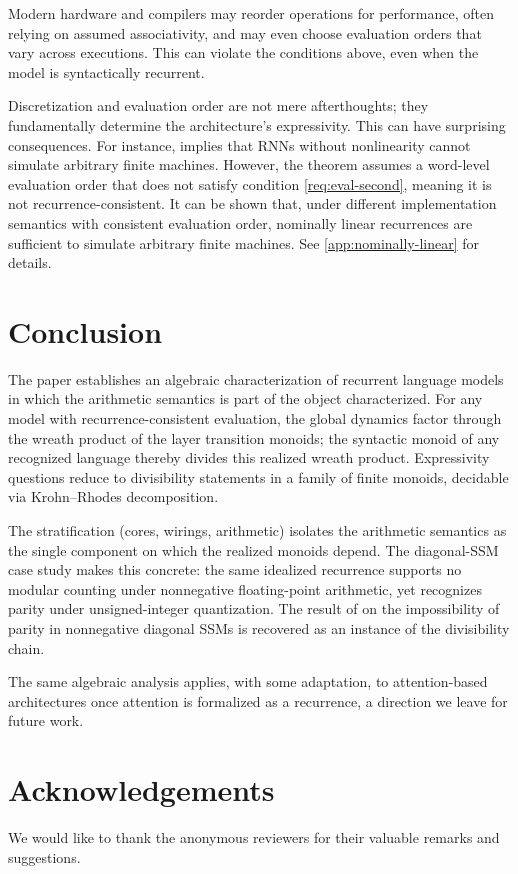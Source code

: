 \documentclass{article}
\begin{document}
Modern hardware and compilers may reorder operations for performance, often relying on assumed associativity, and may even choose evaluation orders that vary across executions. This can violate the conditions above, even when the model is syntactically recurrent.

Discretization and evaluation order are not mere afterthoughts; they fundamentally determine the architecture's expressivity. This can have surprising consequences. For instance, \citet[Theorem 4.2]{merrill2024illusion} implies that RNNs without nonlinearity cannot simulate arbitrary finite machines. However, the theorem assumes a word-level evaluation order that does not satisfy condition \ref{req:eval-second}, meaning it is not recurrence-consistent. It can be shown that, under different implementation semantics with consistent evaluation order, nominally linear recurrences are sufficient to simulate arbitrary finite machines. See \cref{app:nominally-linear} for details.

\section{Conclusion}
The paper establishes an algebraic characterization of recurrent language models in which the arithmetic semantics is part of the object characterized. 
For any model with recurrence-consistent evaluation, the global dynamics factor through the wreath product of the layer transition monoids; the syntactic monoid of any recognized language thereby divides this realized wreath product. 
Expressivity questions reduce to divisibility statements in a family of finite monoids, decidable via Krohn--Rhodes decomposition.

The stratification (cores, wirings, arithmetic) isolates the arithmetic semantics as the single component on which the realized monoids depend. 
The diagonal-SSM case study makes this concrete: the same idealized recurrence supports no modular counting under nonnegative floating-point arithmetic, yet recognizes parity under unsigned-integer quantization. 
The result of \citet{sarrof2024expressive} on the impossibility of parity in nonnegative diagonal SSMs is recovered as an instance of the divisibility chain.

The same algebraic analysis applies, with some adaptation, to attention-based architectures once attention is formalized as a recurrence, a direction we leave for future work.

\section*{Acknowledgements}
We would like to thank the anonymous reviewers for their valuable remarks and suggestions.
\end{document}
